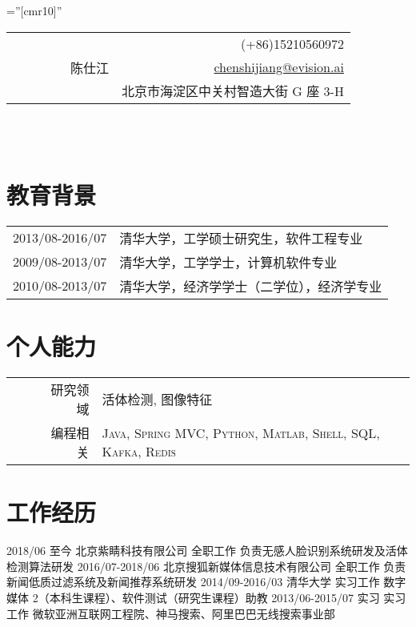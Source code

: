 \documentclass[a4paper,10pt]{professional-cv-cn}
\begin{document}

\pagestyle{empty} %

\font\fb=''[cmr10]'' %

\begin{tabular}{lr}
\multirow{4}{24em}{\Huge ~~~~~~~~~陈仕江}
    & (+86)15210560972 \\
    & \href{mailto:chenshijiang@evision.ai}{chenshijiang@evision.ai} \\
    & 北京市海淀区中关村智造大街 G 座 3-H
\end{tabular}
\\
\\
\section{教育背景}
\begin{tabular}{rl}
 \textsc{2013/08-2016/07} & 清华大学，工学硕士研究生，软件工程专业 \\
 \textsc{2009/08-2013/07} & 清华大学，工学学士，计算机软件专业 \\
 \textsc{2010/08-2013/07} & 清华大学，经济学学士（二学位），经济学专业
\end{tabular}

\section{个人能力}
\begin{tabular}{rl}
 \textsc{~~~~~研究领域}& \textsc{活体检测}, \textsc{图像特征}\\
 \textsc{~~~~~编程相关}& \textsc{Java}, \textsc{Spring MVC}, \textsc{Python}, \textsc{Matlab}, \textsc{Shell}, \textsc{SQL}, \textsc{Kafka}, \textsc{Redis}\\
\end{tabular}

\section{工作经历}
\begin{entrylist}
  \internentry
    {2018/06 至今}
    {北京紫睛科技有限公司}
    {全职工作}
    {负责无感人脸识别系统研发及活体检测算法研发}
  \internentry
    {2016/07-2018/06}
    {北京搜狐新媒体信息技术有限公司}
    {全职工作}
    {负责新闻低质过滤系统及新闻推荐系统研发}
  \internentry
    {2014/09-2016/03}
    {清华大学}
    {实习工作}
    {数字媒体 2（本科生课程）、软件测试（研究生课程）助教}
  \internentry
    {2013/06-2015/07}
    {实习}
    {实习工作}
    {微软亚洲互联网工程院、神马搜索、阿里巴巴无线搜索事业部}
\end{entrylist}
\end{document}
